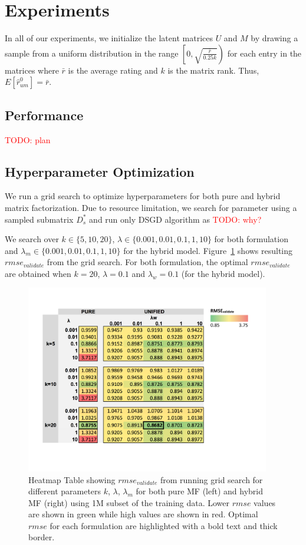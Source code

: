 \documentclass{article} %
\newcommand{\todo}[1]{\textcolor{red}{TODO: #1}}
\begin{document}
\section{Experiments}

In all of our experiments,  we initialize the latent matrices $U$ and $M$ by drawing a sample from a uniform distribution in the range $\left[0,\sqrt{\frac{\bar{r}}{0.25k}}\right)$ for each entry in the matrices where $\bar{r}$ is the average rating and $k$ is the matrix rank. Thus, $E[\hat{r}_{um}^0] = \bar{r}$.

\subsection{Performance}

\todo{plan}

\subsection{Hyperparameter Optimization}

We run a grid search to optimize hyperparameters for both pure and hybrid
matrix factorization.
Due to resource limitation, we search for parameter using a sampled submatrix
$D_s^*$ and run only DSGD algorithm as \todo{why?}

We search over $k \in \{5, 10, 20\}$, $\lambda \in \{
0.001, 0.01, 0.1, 1, 10\}$ for both formulation and $\lambda_m \in \{
0.001, 0.01, 0.1, 1, 10\}$ for the hybrid model.  Figure~\ref{fig:gridsearch} shows resulting $rmse_{validate}$ from the grid search.  For both formulation, the optimal $rmse_{validate}$ are obtained when
$k=20$, $\lambda=0.1$ and $\lambda_w=0.1$ (for the hybrid model).

\begin{figure}[h]
\centering
\includegraphics[width=4.2in]{figures/grid}
\caption{\label{fig:gridsearch} Heatmap Table showing $rmse_{validate}$ from
running grid search for different parameters $k$, $\lambda$, $\lambda_m$ for
both pure MF (left) and hybrid MF (right) using 1M subset of the training data.  Lower $rmse$
values are shown in green while high values are shown in red.  Optimal $rmse$
for each formulation are highlighted with a bold text and thick border.}
\end{figure}
\end{document}
